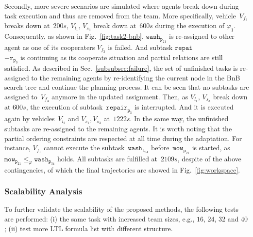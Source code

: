 Secondly, more severe scenarios are simulated where agents break down
during task execution and thus are removed from the team.
More specifically, vehicle~$V_{f_3}$ breaks down at~$200s$, $V_{l_1},\, V_{s_3}$ break
down at~$600s$ during the execution of $\varphi_1$.
Consequently, as shown in Fig.~\ref{fig:task2-bnb}, $\texttt{wash}_{\texttt{p}_{21}}$
is re-assigned to other agent as one of its cooperaters $V_{f_3}$ is failed. And subtask
$\texttt{repai}$\\$-\texttt{r}_{\texttt{p}_{3}}$ is continuing as its cooperate situation and partial relations
are still satisfied. As described in Sec.~\ref{subsubsec:failure},
the set of unfinished tasks is re-assigned to the remaining agents by re-identifying
the current node in the BnB search tree and continue the planning process.
It can be seen that no subtasks are assigned to~$V_{f_3}$ anymore in the updated assignment.
Then, as $V_{l_1},\, V_{s_3}$ break down at $600s$, the execution of subtask~$\texttt{repair}_{\texttt{p}_{3}}$
is interrupted. And it is executed again by vehicles~$V_{l_2}$ and $V_{s_1},V_{s_3}$ at~$1222s$.
In the same way, the unfinished subtasks are re-assigned to the remaining agents.
It is worth noting that the partial ordering constraints are respected at all
time during the adaptation.
For instance, $V_{f_1}$ cannot execute the subtask~$\texttt{wash}_{\texttt{t}_{34}}$
before~$\texttt{mow}_{\texttt{p}_{21}}$ is started,
as~$\texttt{mow}_{\texttt{p}_{21}}\leq_\varphi\texttt{wash}_{\texttt{p}_{34}}  $ holds.
All subtasks are fulfilled at~$2109s$, despite of the above contingencies,
of which the final trajectories are showed in Fig.~\ref{fig:workspace}.



\subsubsection{Scalability Analysis}\label{subsubsec:scalable}
To further validate the scalability of the proposed methods,
the following tests are performed:
(i) the same task with increased team sizes,
e.g., $16$, $24$, $32$ and $40$;
(ii) test more LTL formula list with different structure.

